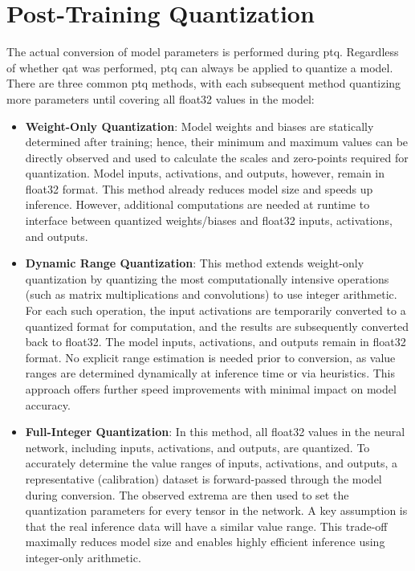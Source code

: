{

\section{Post-Training Quantization}

The actual conversion of model parameters is performed during \gls{ptq}.
Regardless of whether \gls{qat} was performed, \gls{ptq} can always be applied to quantize a model.
There are three common \gls{ptq} methods, with each subsequent method quantizing more parameters until covering all \gls{float32} values in the model:

\begin{itemize}
\item \textbf{Weight-Only Quantization}: Model weights and biases are statically determined after training;
hence, their minimum and maximum values can be directly observed and used to calculate the scales and zero-points required for quantization.
Model inputs, activations, and outputs, however, remain in \gls{float32} format. This method already reduces model size and speeds up inference.
However, additional computations are needed at runtime to interface between quantized weights/biases and \gls{float32} inputs, activations, and outputs.
\item \textbf{Dynamic Range Quantization}: This method extends weight-only quantization by quantizing the most computationally intensive
operations (such as matrix multiplications and convolutions) to use integer arithmetic.
For each such operation, the input activations are temporarily converted to a quantized format for computation, and the results are subsequently converted back to \gls{float32}.
The model inputs, activations, and outputs remain in \gls{float32} format. No explicit range estimation is needed prior to conversion,
as value ranges are determined dynamically at inference time or via heuristics. This approach offers further speed improvements with minimal impact on model accuracy.
\item \textbf{Full-Integer Quantization}: In this method, all \gls{float32} values in the neural network, including inputs, activations, and outputs, are quantized.
To accurately determine the value ranges of inputs, activations, and outputs, a representative (calibration) dataset is forward-passed through the model during conversion.
The observed extrema are then used to set the quantization parameters for every tensor in the network. A key assumption is that the real inference data will have a similar value range.
This trade-off maximally reduces model size and enables highly efficient inference using integer-only arithmetic.
\end{itemize}

}
